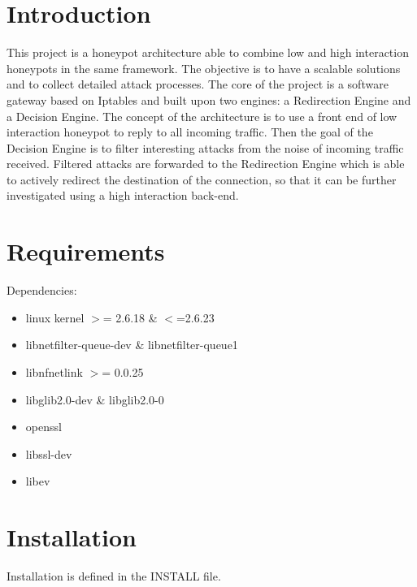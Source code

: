 \section{Introduction}\label{main_Introduction}
This project is a honeypot architecture able to combine low and high interaction honeypots in the same framework. The objective is to have a scalable solutions and to collect detailed attack processes. The core of the project is a software gateway based on Iptables and built upon two engines: a Redirection Engine and a Decision Engine. The concept of the architecture is to use a front end of low interaction honeypot to reply to all incoming traffic. Then the goal of the Decision Engine is to filter interesting attacks from the noise of incoming traffic received. Filtered attacks are forwarded to the Redirection Engine which is able to actively redirect the destination of the connection, so that it can be further investigated using a high interaction back-end.\section{Requirements}\label{main_Requirements}
Dependencies:\begin{itemize}
\item linux kernel $>$= 2.6.18 \& $<$=2.6.23\item libnetfilter-queue-dev \& libnetfilter-queue1\item libnfnetlink $>$= 0.0.25\item libglib2.0-dev \& libglib2.0-0\item openssl\item libssl-dev\item libev\end{itemize}
\section{Installation}\label{main_Installation}
Installation is defined in the INSTALL file. 
